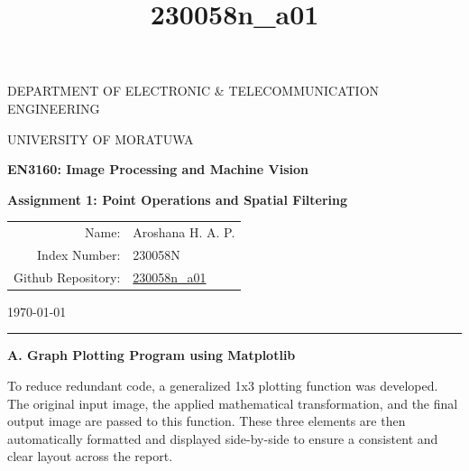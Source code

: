 \documentclass[11pt]{article}
\title{230058n\_a01}
\begin{document}
    
    
    \begin{center}
    {\large
    DEPARTMENT OF ELECTRONIC \& TELECOMMUNICATION ENGINEERING
    \par}
    {\large
    UNIVERSITY OF MORATUWA
    \par}

    {\Large \textbf{EN3160: Image Processing and Machine Vision} \par}
    {\LARGE\bfseries
    Assignment 1: Point Operations and Spatial Filtering
    \par}

    \begin{tabular}{r l}
        Name: & Aroshana H. A. P. \\
        Index Number: & 230058N \\
        Github Repository: & \href{https://github.com/aroshana188/Image-Processing-and-Machine-Vision.git}{230058n\_a01}\\
    \end{tabular}
    
    {\large \today\par}
    \end{center}


\begin{center}\rule{1\linewidth}{1pt}\end{center}

    \textbf{\Large A. Graph Plotting Program using Matplotlib}

    To reduce redundant code, a generalized 1x3 plotting function was
developed. The original input image, the applied mathematical
transformation, and the final output image are passed to this function.
These three elements are then automatically formatted and displayed
side-by-side to ensure a consistent and clear layout across the report.
\end{document}
